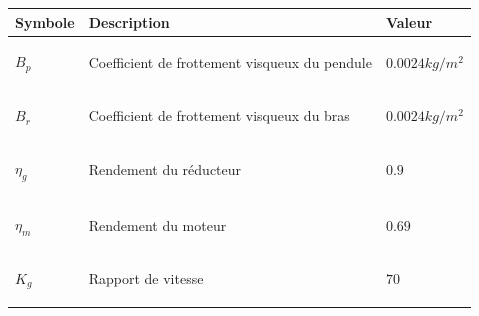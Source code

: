 \documentclass[12pt, a4paper, openany]{report}
\begin{document}
\begin{tabular}{|R{2cm}|C{8cm}|L{2.5cm}|}
\hline {} Symbole & Description &  Valeur  \\
\hline  \begin{center} $B_{p}$\end{center}  &  \begin{center}Coefficient de frottement visqueux du pendule\end{center}  & \begin{center}$0.0024 kg/m^{2}$ \end{center}  \\
\hline  \begin{center} $B_{r}$\end{center} & \begin{center}Coefficient de frottement visqueux du bras\end{center} & \begin{center}$0.0024 kg/m^{2}$ \end{center}\\
\hline  \begin{center} $\eta_{g}$\end{center}  &  \begin{center}Rendement du réducteur\end{center}  & \begin{center}$0.9$ \end{center}  \\
\hline  \begin{center} $\eta_{m}$\end{center}  &  \begin{center}Rendement du moteur\end{center}  & \begin{center}$0.69$ \end{center}  \\
\hline  \begin{center} $K_{g}$\end{center}  &  \begin{center}Rapport de vitesse\end{center}  & \begin{center}$70$ \end{center}  \\

\hline 
\end{tabular}


\end{document}
